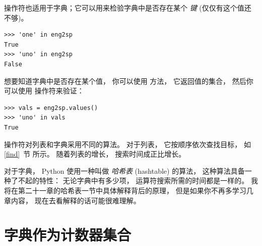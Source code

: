  操作符也适用于字典；它可以用来检验字典中是否存在某个 {\em 键} (仅仅有这个值还不够)。

  

\begin{lstlisting}
>>> 'one' in eng2sp
True
>>> 'uno' in eng2sp
False
\end{lstlisting}

%

想要知道字典中是否存在某个值， 你可以使用  方法， 它返回值的集合， 然后你可以使用  操作符来验证：

  

\begin{lstlisting}
>>> vals = eng2sp.values()
>>> 'uno' in vals
True
\end{lstlisting}

%

 操作符对列表和字典采用不同的算法。
对于列表， 它按顺序依次查找目标， 如 \ref{find}~节 所示。
随着列表的增长， 搜索时间成正比增长。


对于字典， Python 使用一种叫做 {\em 哈希表} (hashtable) 的算法，
这种算法具备一种了不起的特性： 无论字典中有多少项，   运算符搜索所需的时间都是一样的。   我将在第二十一章的哈希表一节中具体解释背后的原理，
但是如果你不再多学习几章内容， 现在去看解释的话可能很难理解。

\section{字典作为计数器集合}
\label{histogram}

